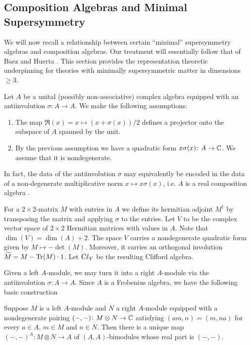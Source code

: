 \documentclass[10pt, oneside]{article}
\begin{document}
\subsection{Composition Algebras and Minimal Supersymmetry}
\label{sect:compositionalgebras}

We will now recall a relationship between certain ``minimal'' supersymmetry algebras and composition algebras. Our treatment will essentially follow that of Baez and Huerta \cite{BaezHuerta}.
This section provides the representation theoretic underpinning for theories with minimally supersymmetric matter in dimensions $\geq 3$.

Let $A$ be a unital (possibly non-associative) complex algebra equipped with an antiinvolution $\sigma\colon A\rightarrow A$. We make the following assumptions:
\begin{enumerate}
\item The map $\Re(x)=x\mapsto (x + \sigma(x))/2$ defines a projector onto the subspace of $A$ spanned by the unit.

\item By the previous assumption we have a quadratic form $x\sigma(x)\colon A\rightarrow \mathbb C$. We assume that it is nondegenerate.
\end{enumerate}

In fact, the data of the antiinvolution $\sigma$ may equivalently be encoded in the data of a non-degenerate multiplicative norm $x\mapsto x\sigma(x)$, i.e. $A$ is a real composition algebra \cite[Chapter 1.3]{SpringerVeldkamp}.

For a $2\times 2$-matrix $M$ with entries in $A$ we define its hermitian adjoint $M^\dagger$ by transposing the matrix and applying $\sigma$ to the entries. 
Let $V$ to be the complex vector space of $2\times 2$ Hermitian matrices with values in $A$.
Note that $\dim(V) = \dim(A) + 2$. 
The space $V$ carries a nondegenerate quadratic form given by $M\mapsto -\det(M)$. 
Moreover, it carries an orthogonal involution $\widetilde{M} = M - \operatorname{Tr}(M)\cdot 1$.
Let ${\rm C}\ell_V$ be the resulting Clifford algebra.


Given a left $A$-module, we may turn it into a right $A$-module via the antiinvolution $\sigma\colon A\rightarrow A$. Since $A$ is a Frobenius algebra, we have the following basic construction 

\begin{lemma}
Suppose $M$ is a left $A$-module and $N$ a right $A$-module equipped with a nondegenerate pairing $(-, -)\colon M\otimes N\rightarrow \mathbb C$ satisfying $(am, n) = (m, na)$ for every $a\in A$, $m\in M$ and $n\in N$. Then there is a unique map $(-, -)^A\colon M\otimes N\rightarrow A$ of $(A, A)$-bimodules whose real part is $(-, -)$.
\label{lm:extendpairing}
\end{lemma}
\end{document}
